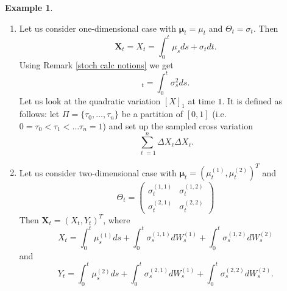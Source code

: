 \documentclass[a4paper,11pt]{article}
\theoremstyle{plain}
\theoremstyle{definition}
\newtheorem{exmp}[thm]{Example}
\begin{document}
	\begin{exmp} \label{quad var} \
		\begin{enumerate}
			\item Let us consider one-dimensional case with $\boldsymbol{\mu}_t = \mu_t$ and $\Theta_t = \sigma_t$.
			Then
			\[ \mathbf{X}_t = X_t = \int_0^t \mu_s ds + \sigma_t dt. \]
			Using Remark \ref{stoch calc notions} we get
			\begin{equation}
			[X]_t = \int_{0}^{t} \sigma_s^2 ds.
			\end{equation}
			Let us look at the quadratic variation $[X]_1$ at time $1$. It is defined as follows: let $\Pi = \{ \tau_0, \dots, \tau_n \}$ be a partition of $[0, 1]$ (i.e. $0 = \tau_0 < \tau_1 < \dots \tau_n = 1$) and set up the sampled cross variation
			\begin{equation}
			\sum_{\ell = 1}^{n} \Delta X_\ell \Delta X_\ell.
			\end{equation}
			
			
			
			\item 
			Let us consider two-dimensional case with $\boldsymbol{\mu}_t = (\mu^{(1)}_t, \mu^{(2)}_t)^T$ and
			\[\Theta_t = \begin{pmatrix}
			\sigma^{(1,1)}_t & \sigma^{(1,2)}_t \\
			\sigma^{(2,1)}_t & \sigma^{(2,2)}_t
			\end{pmatrix} \]
			Then $\mathbf{X}_t = (X_t, Y_t)^T$, where 
			\[X_t = \int_0^t\mu^{(1)}_s ds + \int_0^t\sigma^{(1,1)}_s dW_s^{(1)} + \int_0^t\sigma^{(1,2)}_s dW_s^{(2)}\] 
			and
			\[Y_t = \int_0^t\mu^{(2)}_s ds + \int_0^t\sigma^{(2,1)}_s dW_s^{(1)} + \int_0^t\sigma^{(2,2)}_s dW_s^{(2)}.\]
			

\end{enumerate}
\end{exmp}
\end{document}
